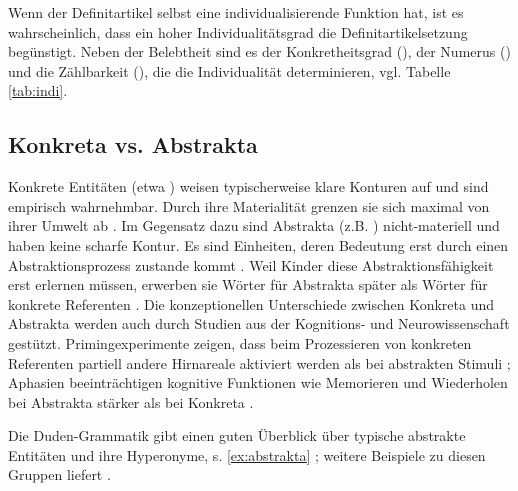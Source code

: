 \begin{exe}
	\ex \label{ex:unspez}
	\begin{xlist}
		\ex \label{ex:schule} 
		\ex \label{ex:dieschule} 
	\end{xlist}
\end{exe} 

Wenn der Definitartikel selbst eine individualisierende Funktion hat, ist es wahrscheinlich, dass ein hoher Individualitätsgrad die Definitartikelsetzung begünstigt. Neben der Belebtheit sind es der Konkretheitsgrad (), der Numerus () und die Zählbarkeit (), die 
die Individualität determinieren, vgl. Tabelle \ref{tab:indi}.

\subsection{Konkreta vs. Abstrakta}\label{sec:konabst}

Konkrete Entitäten (etwa ) weisen typischerweise klare Konturen auf und sind empirisch wahrnehmbar. Durch ihre Materialität grenzen sie sich maximal von ihrer Umwelt ab \parencite[344]{Szczepaniak2011}. Im Gegensatz dazu sind Abstrakta (z.B. ) nicht-materiell und haben keine scharfe Kontur. Es sind Einheiten, deren Bedeutung erst durch einen Abstraktionsprozess zustande kommt \parencite[279]{Ewald1992}. Weil Kinder diese Abstraktionsfähigkeit erst erlernen müssen, erwerben sie Wörter für Abstrakta später als Wörter für konkrete Referenten \parencite[396]{Bergelson2013}. Die konzeptionellen Unterschiede zwischen Konkreta und Abstrakta werden auch durch Studien aus der Kognitions- und Neurowissenschaft gestützt. Primingexperimente zeigen, dass beim Prozessieren von konkreten Referenten partiell andere Hirnareale aktiviert werden als bei abstrakten Stimuli \parencite{Binder2005,Weiss2013}; Aphasien beeinträchtigen kognitive Funktionen wie Memorieren und Wiederholen bei Abstrakta stärker als bei Konkreta \parencite{Moss1995,Moss1997}.

Die Duden-Grammatik gibt einen guten Überblick über typische abstrakte Entitäten und ihre Hyperonyme, s. \ref{ex:abstrakta} \parencite[146f.]{Duden2009}; weitere Beispiele zu diesen Gruppen liefert \textcite[143]{Schrauf2011}.

